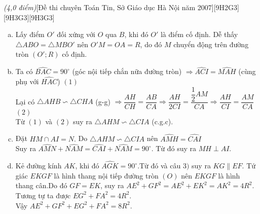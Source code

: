 \begin{ex}{\it{(4,0 điểm)}}[Đề thi chuyên Toán Tin, Sở Giáo dục Hà Nội năm 2007][9H2G3][9H3G3][9H3G3]
{\begin{center}
	\end{center}
\begin{enumerate}[a)]
	\item Lấy điểm $O'$ đối xứng với $O$ qua $B$, khi đó $O'$ là điểm cố định. Dễ thấy $\triangle ABO = \triangle MBO'$ nên $O'M=OA=R$, do đó $M$ chuyển động trên đường tròn $(O';R)$ cố định.
	\item Ta có $\widehat{BAC}=90^{\circ}$ (góc nội tiếp chắn nữa đường tròn)
	$\Rightarrow \widehat{ACI}=\widehat{MAH}$ (cùng phụ với $\widehat{HAC}$) \hfill$(1)$\\
	Lại có $\triangle AHB \backsim \triangle CHA$ (g-g) $\Rightarrow \dfrac{AH}{CH}=\dfrac{AB}{CA} \Rightarrow \dfrac{AH}{2CI}=\dfrac{\dfrac{1}{2}AM}{CA}\Rightarrow \dfrac{AH}{CI}=\dfrac{AM}{CA}$ \hfill$(2)$\\
	Từ $(1)$ và $(2)$ suy ra $\triangle AHM \backsim \triangle CIA$ (c.g.c).
	\item Đặt $HM\cap AI={N}.$ Do $\triangle AHM \backsim \triangle CIA$ nên $\widehat{AMH}=\widehat{CAI}$\\ 
	Suy ra $\widehat{AMN}+\widehat{NAM}=\widehat{CAI}+\widehat{NAM}=90^{\circ}.$
	Từ đó suy ra $MH \perp AI.$
	\item Kẻ đường kính $AK$, khi đó $\widehat{AGK}=90^{\circ}$.Từ đó và câu $3)$ suy ra $KG \parallel EF.$ Tứ giác $EKGF$ là hình thang nội tiếp đường tròn $(O)$ nên $EKGF$ là hình thang cân.Do đó $GF=EK$, suy ra $AE^2+GF^2=AE^2+EK^2=AK^2=4R^2.$
	Tương tự ta được $EG^2+FA^2=4R^2.$\\
	Vậy $AE^2+GF^2+EG^2+FA^2=8R^2.$  
\end{enumerate}
}
\end{ex}
